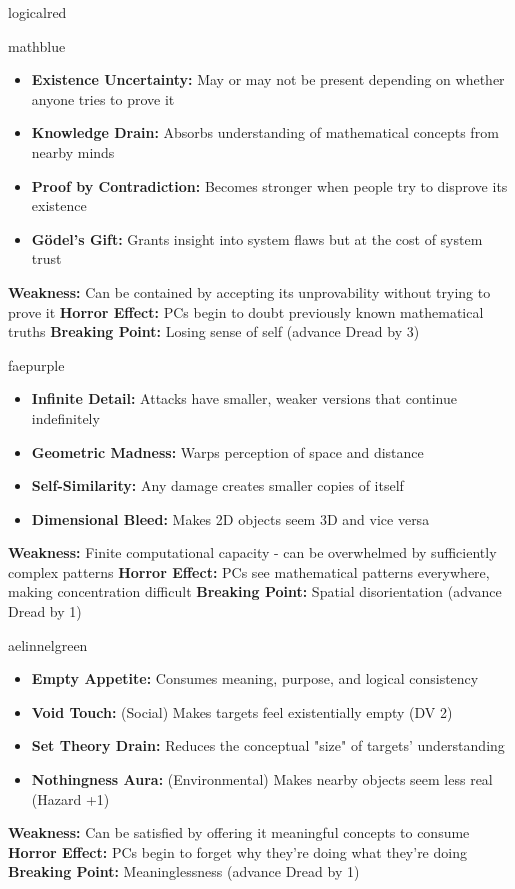 \documentclass[11pt]{article}
\begin{document}
\begin{campaignsection}{logicalred}
\begin{npcbox}{mathblue}
\begin{itemize}
    \item \textbf{Existence Uncertainty:} May or may not be present depending on whether anyone tries to prove it
    \item \textbf{Knowledge Drain:} Absorbs understanding of mathematical concepts from nearby minds
    \item \textbf{Proof by Contradiction:} Becomes stronger when people try to disprove its existence
    \item \textbf{Gödel's Gift:} Grants insight into system flaws but at the cost of system trust
\end{itemize}
\textbf{Weakness:} Can be contained by accepting its unprovability without trying to prove it
\textbf{Horror Effect:} PCs begin to doubt previously known mathematical truths
\textbf{Breaking Point:} Losing sense of self (advance Dread by 3)
\end{npcbox}

\begin{npcbox}{faepurple}
\begin{itemize}
    \item \textbf{Infinite Detail:} Attacks have smaller, weaker versions that continue indefinitely
    \item \textbf{Geometric Madness:} Warps perception of space and distance
    \item \textbf{Self-Similarity:} Any damage creates smaller copies of itself
    \item \textbf{Dimensional Bleed:} Makes 2D objects seem 3D and vice versa
\end{itemize}
\textbf{Weakness:} Finite computational capacity - can be overwhelmed by sufficiently complex patterns
\textbf{Horror Effect:} PCs see mathematical patterns everywhere, making concentration difficult
\textbf{Breaking Point:} Spatial disorientation (advance Dread by 1)
\end{npcbox}

\begin{npcbox}{aelinnelgreen}
\begin{itemize}
    \item \textbf{Empty Appetite:} Consumes meaning, purpose, and logical consistency
    \item \textbf{Void Touch:} (Social) Makes targets feel existentially empty (DV 2)
    \item \textbf{Set Theory Drain:} Reduces the conceptual "size" of targets' understanding
    \item \textbf{Nothingness Aura:} (Environmental) Makes nearby objects seem less real (Hazard +1)
\end{itemize}
\textbf{Weakness:} Can be satisfied by offering it meaningful concepts to consume
\textbf{Horror Effect:} PCs begin to forget why they're doing what they're doing
\textbf{Breaking Point:} Meaninglessness (advance Dread by 1)
\end{npcbox}


\end{campaignsection}
\end{document}
